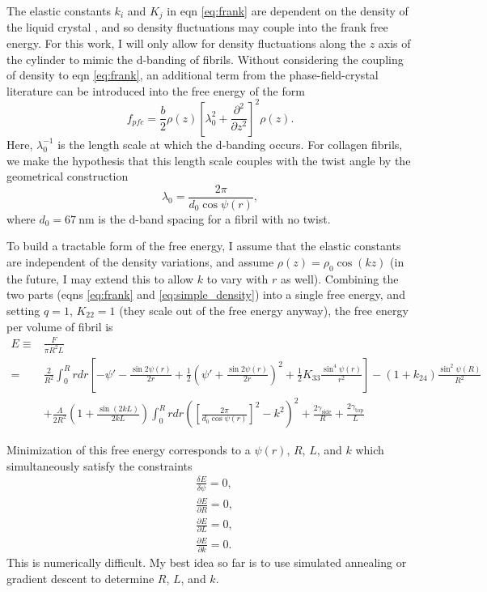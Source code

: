 \documentclass[12pt]{article}
\begin{document}
The elastic constants $k_i$ and $K_j$ in eqn \ref{eq:frank} are dependent on the density of the liquid crystal \cite{Odijk:liqcryst1986}, and so density fluctuations may couple into the frank free energy. For this work, I will only allow for density fluctuations along the $z$ axis of the cylinder to mimic the d-banding of fibrils. Without considering the coupling of density to eqn \ref{eq:frank}, an additional term from the phase-field-crystal literature can be introduced into the free energy of the form
\begin{equation}\label{eq:simple_density}
f_{pfc}=\frac{b}{2}\rho(z)\left[\lambda_0^2+\frac{\partial^2}{\partial z^2}\right]^2\rho(z).
\end{equation}
Here, $\lambda_0^{-1}$ is the length scale at which the d-banding occurs. For collagen fibrils, we make the hypothesis that this length scale couples with the twist angle by the geometrical construction
\begin{equation}\label{eq:lmbda}
\lambda_0=\frac{2\pi}{d_0\cos\psi(r)},
\end{equation}
where $d_0=\SI{67}{\nano\meter}$ is the d-band spacing for a fibril with no twist.

To build a tractable form of the free energy, I assume that the elastic constants are independent of the density variations, and assume $\rho(z)=\rho_0\cos(kz)$ (in the future, I may extend this to allow $k$ to vary with $r$ as well). Combining the two parts (eqns \ref{eq:frank} and \ref{eq:simple_density}) into a single free energy, and setting $q=1$, $K_{22}=1$ (they scale out of the free energy anyway), the free energy per volume of fibril is
\begin{align}\label{eq:FE}
E\equiv& \frac{F}{\pi R^2 L}\nonumber\\
=&\frac{2}{R^2}\int_0^Rrdr\left[-\psi'-\frac{\sin2\psi(r)}{2r}+\frac{1}{2}\left(\psi'+\frac{\sin2\psi(r)}{2r}\right)^2+\frac{1}{2}K_{33}\frac{\sin^4\psi(r)}{r^2}\right]-(1+k_{24})\frac{\sin^2\psi(R)}{R^2}\nonumber\\
&+\frac{\Lambda}{2R^2}\left(1+\frac{\sin(2kL)}{2kL}\right)\int_0^Rrdr\left(\left[\frac{2\pi}{d_0\cos\psi(r)}\right]^2-k^2\right)^2+\frac{2\gamma_{\text{side}}}{R}+\frac{2\gamma_{\text{top}}}{L}
\end{align}

Minimization of this free energy corresponds to a $\psi(r)$, $R$, $L$, and $k$ which simultaneously satisfy the constraints
\begin{align}
&\frac{\delta E}{\delta \psi}=0\label{eq:dEdpsi0},\\
&\frac{\partial E}{\partial R}=0\label{eq:dEdR0},\\
&\frac{\partial E}{\partial L}=0\label{eq:dEdL0},\\
&\frac{\partial E}{\partial k}=0\label{eq:dEdk0}.
\end{align}
This is numerically difficult. My best idea so far is to use simulated annealing or gradient descent to determine $R$, $L$, and $k$.


\clearpage


\end{document}

